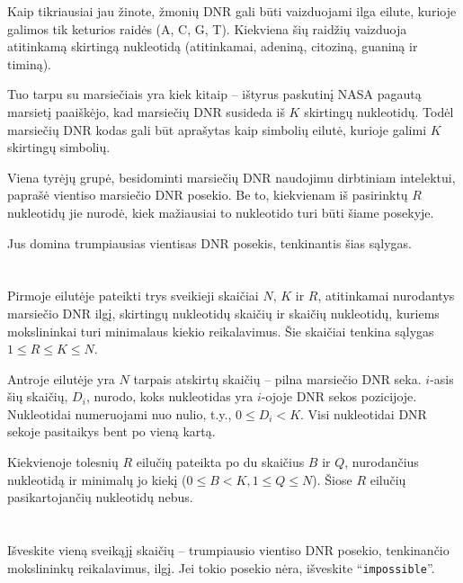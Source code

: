 \ifx\boi\undefined\fi
\def\version{jury-1}

Kaip tikriausiai jau žinote, žmonių DNR gali būti vaizduojami ilga eilute, kurioje galimos tik keturios raidės 
 ({A, C, G, T}). Kiekviena šių raidžių vaizduoja atitinkamą skirtingą nukleotidą (atitinkamai, adeniną, citoziną, guaniną ir timiną).

Tuo tarpu su marsiečiais yra kiek kitaip -- ištyrus paskutinį NASA pagautą marsietį paaiškėjo, kad marsiečių DNR susideda iš $K$ skirtingų nukleotidų. Todėl marsiečių DNR kodas gali būt aprašytas kaip simbolių eilutė, kurioje galimi $K$ skirtingų simbolių.

Viena tyrėjų grupė, besidominti marsiečių DNR naudojimu dirbtiniam intelektui, paprašė vientiso marsiečio DNR posekio. Be to, kiekvienam iš pasirinktų $R$ nukleotidų jie nurodė, kiek mažiausiai to nukleotido turi būti šiame posekyje.

Jus domina trumpiausias vientisas DNR posekis, tenkinantis šias sąlygas.

\section*{}
Pirmoje eilutėje pateikti trys sveikieji skaičiai $N$, $K$ ir $R$, atitinkamai nurodantys marsiečio DNR ilgį, skirtingų nukleotidų skaičių ir skaičių nukleotidų, kuriems mokslininkai turi minimalaus kiekio reikalavimus. Šie skaičiai tenkina sąlygas $1 \le R \le K \le N$.

Antroje eilutėje yra $N$ tarpais atskirtų skaičių -- pilna marsiečio DNR seka. $i$-asis šių skaičių, $D_i$, nurodo, koks nukleotidas yra $i$-ojoje DNR sekos pozicijoje. Nukleotidai numeruojami nuo nulio, t.y., $0
\leq D_i < K$. Visi nukleotidai DNR sekoje pasitaikys bent po vieną kartą.

Kiekvienoje tolesnių $R$ eilučių pateikta po du skaičius $B$ ir $Q$, nurodančius nukleotidą ir minimalų jo kiekį ($0 \le B < K, 1 \le Q \le N$).
Šiose $R$ eilučių pasikartojančių nukleotidų nebus.

\section*{\outputsection}
Išveskite vieną sveikąjį skaičių -- trumpiausio vientiso DNR posekio, tenkinančio mokslininkų reikalavimus, ilgį. Jei tokio posekio nėra, išveskite ``\texttt{impossible}''.

\section*{\constraints}
\testgroups

